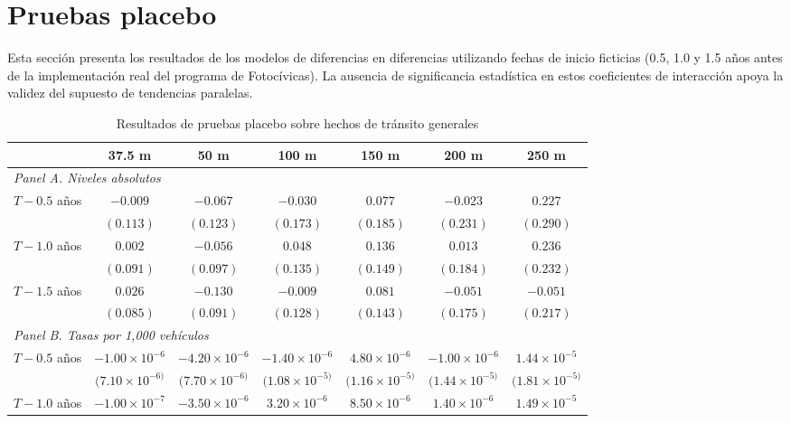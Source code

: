 \clearpage
\section{Pruebas placebo}
\label{sec:pruebas-placebo}
\noindent Esta sección presenta los resultados de los modelos de diferencias en diferencias utilizando fechas de inicio ficticias (0.5, 1.0 y 1.5 años antes de la implementación real del programa de Fotoc\'ivicas). La ausencia de significancia estadística en estos coeficientes de interacción apoya la validez del supuesto de tendencias paralelas.

\begin{table}[htbp]
    \centering
    \caption{Resultados de pruebas placebo sobre hechos de tránsito generales}
    \label{tab:placebo-general}
    \footnotesize
    \begin{adjustbox}{max width=\textwidth}
    \begin{tabular}{lcccccc}
        \toprule
        & 37.5 m & 50 m & 100 m & 150 m & 200 m & 250 m \\
        \midrule
        \multicolumn{7}{l}{\textit{Panel A. Niveles absolutos}} \\
        $T - 0.5$ años & $-0.009$ & $-0.067$ & $-0.030$ & $0.077$ & $-0.023$ & $0.227$ \\
         & $(0.113)$ & $(0.123)$ & $(0.173)$ & $(0.185)$ & $(0.231)$ & $(0.290)$ \\
        $T - 1.0$ años & $0.002$ & $-0.056$ & $0.048$ & $0.136$ & $0.013$ & $0.236$ \\
         & $(0.091)$ & $(0.097)$ & $(0.135)$ & $(0.149)$ & $(0.184)$ & $(0.232)$ \\
        $T - 1.5$ años & $0.026$ & $-0.130$ & $-0.009$ & $0.081$ & $-0.051$ & $-0.051$ \\
         & $(0.085)$ & $(0.091)$ & $(0.128)$ & $(0.143)$ & $(0.175)$ & $(0.217)$ \\
        \midrule
        \multicolumn{7}{l}{\textit{Panel B. Tasas por 1,000 vehículos}} \\
        $T - 0.5$ años & $-1.00\times 10^{-6}$ & $-4.20\times 10^{-6}$ & $-1.40\times 10^{-6}$ & $4.80\times 10^{-6}$ & $-1.00\times 10^{-6}$ & $1.44\times 10^{-5}$ \\
         & $(7.10\times 10^{-6)}$ & $(7.70\times 10^{-6)}$ & $(1.08\times 10^{-5)}$ & $(1.16\times 10^{-5)}$ & $(1.44\times 10^{-5)}$ & $(1.81\times 10^{-5)}$ \\
        $T - 1.0$ años & $-1.00\times 10^{-7}$ & $-3.50\times 10^{-6}$ & $3.20\times 10^{-6}$ & $8.50\times 10^{-6}$ & $1.40\times 10^{-6}$ & $1.49\times 10^{-5}$ \\

\end{tabular}
\end{adjustbox}
\end{table}
